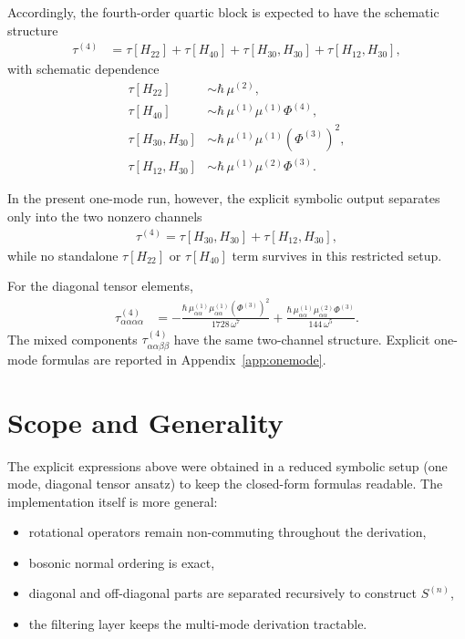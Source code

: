 \documentclass[11pt,a4paper]{article}
\begin{document}
Accordingly, the fourth-order quartic block is expected to have the schematic structure
\begin{align}
\tau^{(4)} &= \tau[H_{22}] + \tau[H_{40}] + \tau[H_{30},H_{30}] + \tau[H_{12},H_{30}],
\end{align}
with schematic dependence
\begin{align}
\tau[H_{22}] &\sim \hbar\,\mu^{(2)},\\
\tau[H_{40}] &\sim \hbar\,\mu^{(1)}\mu^{(1)}\Phi^{(4)},\\
\tau[H_{30},H_{30}] &\sim \hbar\,\mu^{(1)}\mu^{(1)}\left(\Phi^{(3)}\right)^2,\\
\tau[H_{12},H_{30}] &\sim \hbar\,\mu^{(1)}\mu^{(2)}\Phi^{(3)}.
\end{align}

In the present one-mode run, however, the explicit symbolic output separates only into the two
nonzero channels
\begin{align}
\tau^{(4)} = \tau[H_{30},H_{30}] + \tau[H_{12},H_{30}],
\end{align}
while no standalone \(\tau[H_{22}]\) or \(\tau[H_{40}]\) term survives in this restricted setup.

For the diagonal tensor elements,
\begin{align}
\tau_{\alpha\alpha\alpha\alpha}^{(4)} &=
-\frac{\hbar\,\mu_{\alpha\alpha}^{(1)}\mu_{\alpha\alpha}^{(1)}\left(\Phi^{(3)}\right)^2}{1728\,\omega^7}
+\frac{\hbar\,\mu_{\alpha\alpha}^{(1)}\mu_{\alpha\alpha}^{(2)}\Phi^{(3)}}{144\,\omega^5}.
\end{align}
The mixed components \(\tau_{\alpha\alpha\beta\beta}^{(4)}\) have the same two-channel structure.
Explicit one-mode formulas are reported in Appendix~\ref{app:onemode}.

\section{Scope and Generality}
The explicit expressions above were obtained in a reduced symbolic setup (one mode, diagonal
tensor ansatz) to keep the closed-form formulas readable. The implementation itself is more general:
\begin{itemize}
\item rotational operators remain non-commuting throughout the derivation,
\item bosonic normal ordering is exact,
\item diagonal and off-diagonal parts are separated recursively to construct \(S^{(n)}\),
\item the filtering layer keeps the multi-mode derivation tractable.
\end{itemize}
\end{document}

